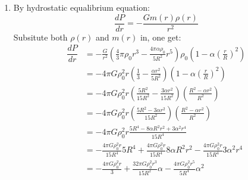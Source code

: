 \documentclass{article}
\begin{document}
\begin{enumerate}
    \item By hydrostatic equalibrium equation:
    \[
    \dfrac{dP}{dr} = -\frac{Gm(r)\rho(r)}{r^2}
    \]
    Subsitute both $\rho(r)$ and $m(r)$ in, one get:
    \begin{align*}
        \dfrac{dP}{dr} &= -\frac{G}{r^2} \left(\frac{4}{3}\pi\rho_0 r^3 - \frac{4\pi\alpha\rho_0}{5R^2}r^5\right) \rho_0\left(1-\alpha\left(\frac{r}{R}\right)^2\right)\\
        &= -4\pi G\rho_0^2 r \left(\frac{1}{3} - \frac{\alpha r^2}{5R^2}\right) \left(1-\alpha\left(\frac{r}{R}\right)^2\right)\\
        &= -4\pi G\rho_0^2 r \left(\frac{5R^2}{15R^2} - \frac{3\alpha r^2}{15R^2}\right) \left(\frac{R^2 - \alpha r^2}{R^2}\right)\\
        &= -4\pi G\rho_0^2 r \left(\frac{5R^2 - 3\alpha r^2}{15R^2}\right) \left(\frac{R^2 - \alpha r^2}{R^2}\right)\\ 
        &= -4\pi G\rho_0^2 r \frac{5R^4 - 8\alpha R^2 r^2 + 3 \alpha^2 r^4}{15R^4}\\
        &= -\frac{4\pi G\rho_0^2 r}{15R^4} 5R^4 + \frac{4\pi G\rho_0^2 r}{15R^4} 8\alpha R^2 r^2 - \frac{4\pi G\rho_0^2 r}{15R^4} 3\alpha^2 r^4\\
        &= -\frac{4\pi G\rho_0^2 r}{3} + \frac{32\pi G\rho_0^2 r^3}{15R^2} \alpha - \frac{4\pi G\rho_0^2 r^5}{5R^4} \alpha^2\\
    \end{align*}
\end{enumerate}
\end{document}
